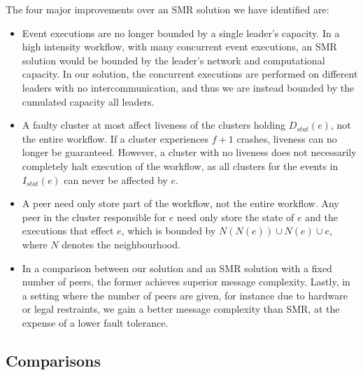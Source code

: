 \documentclass{article}
\begin{document}
    The four major improvements over an SMR solution we have identified are:
    \begin{itemize}
    	\item Event executions are no longer bounded by a single leader's capacity.
	    In a high intensity workflow, with many concurrent event executions, an SMR solution would be bounded by the leader's network and computational capacity.
	    In our solution, the concurrent executions are performed on different leaders with no intercommunication, and thus we are instead bounded by the cumulated capacity all leaders.
    	\item A faulty cluster at most affect liveness of the clusters holding $D_{stat}(e)$, not the entire workflow.
	    If a cluster experiences $f+1$ crashes, liveness can no longer be guaranteed.
	    However, a cluster with no liveness does not necessarily completely halt execution of the workflow, as all clusters for the events in $I_{stat}(e)$ can never be affected by $e$.
    	\item A peer need only store part of the workflow, not the entire workflow.
    	Any peer in the cluster responsible for $e$ need only store the state of $e$ and the executions that effect $e$, which is bounded by $N(N(e)) \cup N(e) \cup e$, where $N$ denotes the neighbourhood.
    	\item In a comparison between our solution and an SMR solution with a fixed number of peers, the former achieves superior message complexity.
    	Lastly, in a setting where the number of peers are given, for instance due to hardware or legal restraints, we gain a better message complexity than SMR, at the expense of a lower fault tolerance.
    \end{itemize}

    \subsection{Comparisons}
\end{document}
